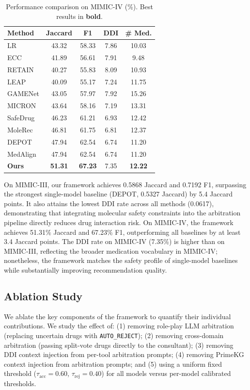 \documentclass[sigconf,anonymous]{acmart}
\begin{document}
\begin{table}[h]
\centering
\caption{Performance comparison on MIMIC-IV (\%). Best results in \textbf{bold}.}
\label{tab:mimic4}
\begin{tabular}{lcccc}
\hline
\textbf{Method} & \textbf{Jaccard} & \textbf{F1} & \textbf{DDI} & \textbf{\# Med.} \\
\hline
LR      & 43.32 & 58.33 & 7.86 & 10.03 \\
ECC     & 41.89 & 56.61 & 7.91 &  9.48 \\
RETAIN  & 40.27 & 55.83 & 8.09 & 10.93 \\
LEAP    & 40.09 & 55.17 & 7.24 & 11.75 \\
GAMENet & 43.05 & 57.97 & 7.92 & 15.26 \\
MICRON  & 43.64 & 58.16 & 7.19 & 13.31 \\
SafeDrug& 46.23 & 61.21 & 6.93 & 12.42 \\
MoleRec & 46.81 & 61.75 & 6.81 & 12.37 \\
DEPOT   & 47.94 & 62.54 & 6.74 & 11.20 \\
MedAlign& 47.94 & 62.54 & 6.74 & 11.20 \\
\hline
\textbf{Ours} & \textbf{51.31} & \textbf{67.23} & 7.35 & \textbf{12.22} \\
\hline
\end{tabular}
\end{table}

On MIMIC-III, our framework achieves 0.5868 Jaccard and 0.7192 F1, surpassing the strongest single-model baseline (DEPOT, 0.5327 Jaccard) by 5.4 Jaccard points. It also attains the lowest DDI rate across all methods (0.0617), demonstrating that integrating molecular safety constraints into the arbitration pipeline directly reduces drug interaction risk. On MIMIC-IV, the framework achieves 51.31\% Jaccard and 67.23\% F1, outperforming all baselines by at least 3.4 Jaccard points. The DDI rate on MIMIC-IV (7.35\%) is higher than on MIMIC-III, reflecting the broader medication vocabulary in MIMIC-IV; nonetheless, the framework matches the safety profile of single-model baselines while substantially improving recommendation quality.

\subsection{Ablation Study}


We ablate the key components of the framework to quantify their individual contributions. We study the effect of: (1) removing role-play LLM arbitration (replacing uncertain drugs with \texttt{AUTO\_REJECT}); (2) removing cross-domain arbitration (passing split-vote drugs directly to the consultant); (3) removing DDI context injection from per-tool arbitration prompts; (4) removing PrimeKG context injection from arbitration prompts; and (5) using a uniform fixed threshold ($\tau_{\text{acc}} = 0.60$, $\tau_{\text{rej}} = 0.40$) for all models versus per-model calibrated thresholds.
\end{document}
